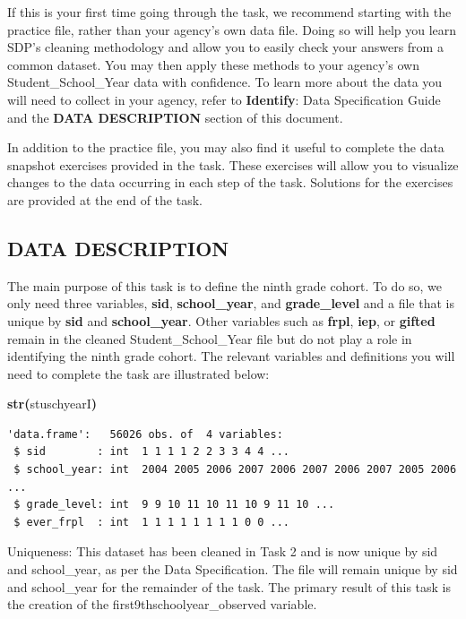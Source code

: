 \documentclass[12pt]{article}
\makeatletter
\newcommand{\hlfunctioncall}[1]{\textcolor[rgb]{0.501960784313725,0,0.329411764705882}{\textbf{#1}}}%
\newcommand{\hlkeyword}[1]{\textcolor[rgb]{0,0,0}{\textbf{#1}}}%
\newcommand{\hlsymbol}[1]{\textcolor[rgb]{0,0,0}{#1}}%
\newenvironment{kframe}{%
 \def\FrameCommand##1{\hskip\@totalleftmargin \hskip-\fboxsep
 \colorbox{shadecolor}{##1}\hskip-\fboxsep
     \hskip-\linewidth \hskip-\@totalleftmargin \hskip\columnwidth}%
 \MakeFramed {\advance\hsize-\width
   \@totalleftmargin\z@ \linewidth\hsize
   \@setminipage}}%
 {\par\unskip\endMakeFramed}
\newenvironment{knitrout}{}{} %
\renewenvironment{knitrout}{\begin{footnotesize}}{\end{footnotesize}}
\makeatother
\begin{document}
If this is your first time going through the task, we recommend starting with the practice file, rather than your agency’s own 
data file.  Doing so will help you learn SDP’s cleaning methodology and allow you to easily check your answers from a common 
dataset.  You may then apply these methods to your agency’s own Student\_School\_Year data with confidence.  To learn more 
about the data you will need to collect in your agency, refer to \textbf{Identify}: Data Specification Guide and the \textbf{DATA DESCRIPTION}
section of this document.

In addition to the practice file, you may also find it useful to complete the data snapshot exercises provided in the task.  These 
exercises will allow you to visualize changes to the data occurring in each step of the task.  Solutions for the exercises are 
provided at the end of the task. 

\subsection{DATA DESCRIPTION}
The main purpose of this task is to define the ninth grade cohort.  To do so, we only need three variables, \textbf{sid}, \textbf{school\_year}, and 
\textbf{grade\_level} and a file that is unique by \textbf{sid} and \textbf{school\_year}.  Other variables such as \textbf{frpl}, \textbf{iep}, or \textbf{gifted} remain in the cleaned 
Student\_School\_Year file but do not play a role in identifying the ninth grade cohort.  The relevant variables and definitions you 
will need to complete the task are illustrated below:

\begin{knitrout}
\color{fgcolor}\begin{kframe}
\begin{flushleft}
\ttfamily\noindent
\hlfunctioncall{str}\hlkeyword{(}\hlsymbol{stuschyearI}\hlkeyword{)}\mbox{}
\normalfont
\end{flushleft}
\begin{verbatim}
'data.frame':	56026 obs. of  4 variables:
 $ sid        : int  1 1 1 1 2 2 3 3 4 4 ...
 $ school_year: int  2004 2005 2006 2007 2006 2007 2006 2007 2005 2006 ...
 $ grade_level: int  9 9 10 11 10 11 10 9 11 10 ...
 $ ever_frpl  : int  1 1 1 1 1 1 1 1 0 0 ...
\end{verbatim}
\end{kframe}
\end{knitrout}


Uniqueness: This dataset has been cleaned in Task 2 and is now unique by sid and school\_year, as per the Data Specification. 
The file will remain unique by sid and school\_year for the remainder of the task. The primary result of this task is the creation of 
the first9thschoolyear\_observed variable.
\end{document}
